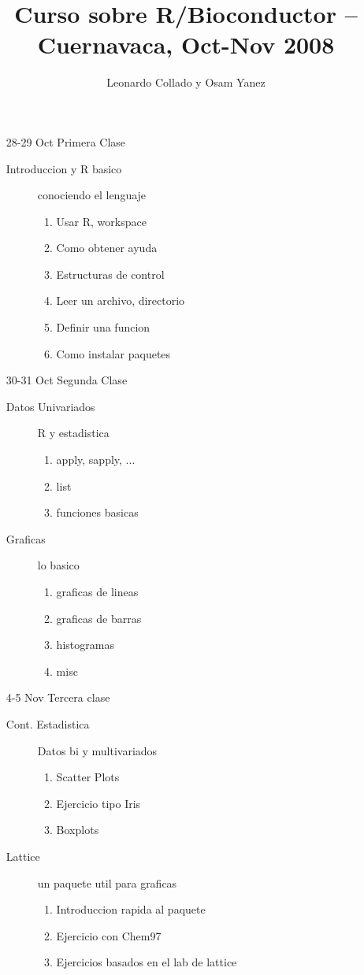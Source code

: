 \documentclass[letterpaper,12pt]{article}
\title{Curso sobre R/Bioconductor -- Cuernavaca, Oct-Nov 2008}
\author{Leonardo Collado y Osam Yanez}
\begin{document}
\maketitle

\begin{itemize} 
\item[28-29 Oct] Primera Clase
  \begin{description}
  \item[Introduccion y R basico] conociendo el lenguaje
    \begin{enumerate}
      \item Usar R, workspace
      \item Como obtener ayuda
	  \item Estructuras de control
	  \item Leer un archivo, directorio
      \item Definir una funcion
	  \item Como instalar paquetes
    \end{enumerate}
  \end{description}

\item[30-31 Oct] Segunda Clase
  \begin{description}
  \item[Datos Univariados] R y estadistica
    \begin{enumerate}
      \item apply, sapply, ...
      \item list
      \item funciones basicas
    \end{enumerate}
  \item[Graficas] lo basico
	\begin{enumerate}
	  \item graficas de lineas
	  \item graficas de barras
	  \item histogramas
	  \item misc
	\end{enumerate}
  \end{description}

\item[4-5 Nov] Tercera clase
  \begin{description}
  \item[Cont. Estadistica] Datos bi y multivariados
    \begin{enumerate}
      \item Scatter Plots
      \item Ejercicio tipo Iris
      \item Boxplots
    \end{enumerate}
  \item[Lattice] un paquete util para graficas
    \begin{enumerate}
      \item Introduccion rapida al paquete
	  \item Ejercicio con Chem97
      \item Ejercicios basados en el lab de lattice
    \end{enumerate}
  \end{description}


\end{itemize}
\end{document}
